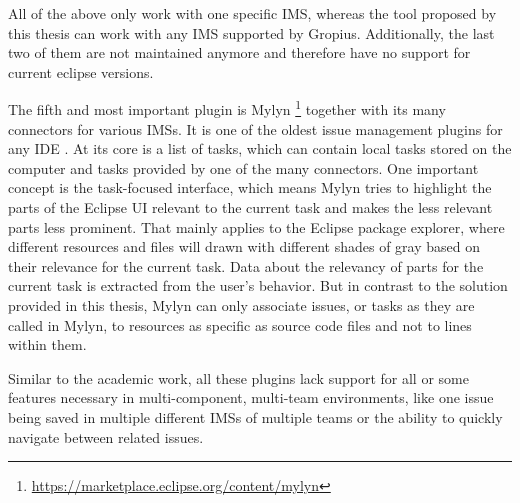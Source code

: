 All of the above only work with one specific \gls{IMS}, whereas the tool proposed by this thesis can work with any \gls{IMS} supported by \gls{Gropius}.
Additionally, the last two of them are not maintained anymore and therefore have no support for current eclipse versions. 

The fifth and most important plugin is Mylyn \footnote{\url{https://marketplace.eclipse.org/content/mylyn}} together with its many connectors for various \glspl{IMS}.
It is one of the oldest issue management plugins for any \gls{IDE} \cite{janak2009issue}.
At its core is a list of tasks, which can contain local tasks stored on the computer and tasks provided by one of the many connectors.
One important concept is the task-focused interface, which means Mylyn tries to highlight the parts of the \gls{Eclipse} \gls{UI} relevant to the current task and makes the less relevant parts less prominent.
That mainly applies to the \gls{Eclipse} package explorer, where different resources and files will drawn with different shades of gray based on their relevance for the current task.
Data about the relevancy of parts for the current task is extracted from the user's behavior.
But in contrast to the solution provided in this thesis, Mylyn can only associate issues, or tasks as they are called in Mylyn, to resources as specific as source code files and not to lines within them.

Similar to the academic work, all these plugins lack support for all or some features necessary in multi-component, multi-team environments,
like one issue being saved in multiple different \glspl{IMS} of multiple teams or the ability to quickly navigate between related issues.

